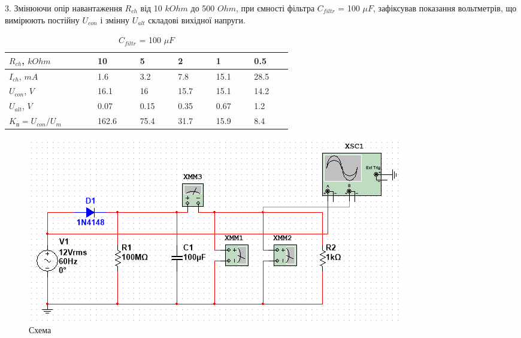 \documentclass{article}
\begin{document}
\begin{normalsize}
	3. Змінюючи опір навантаження $R_{ch}$ від 10 $kOhm$ до 500 $Ohm$, при ємності фільтра $C_{filtr}$ = 100 $\mu F$, зафіксував показання вольтметрів, що вимірюють постійну $U_{con}$ і змінну $U_{alt}$ складові вихідної напруги.
	
	\begin{table}[H]
		\centering
		\renewcommand*\arraystretch{1.3}
		\begin{tabular}{|p{0.15\linewidth}|p{0.08\linewidth}|p{0.08\linewidth}|p{0.08\linewidth}|p{0.08\linewidth}|p{0.08\linewidth}|}
			\hline
			$R_{ch}$, $kOhm$& 10 & 5 & 2 & 1 & 0.5\\
			\hline
			$I_{ch}$, $mA$& 1.6 & 3.2 & 7.8 & 15.1 & 28.5\\
			\hline
			$U_{con}$, $V$& 16.1 & 16 & 15.7 & 15.1 & 14.2\\
			\hline
			$U_{alt}$, $V$& 0.07 & 0.15 & 0.35 & 0.67 &1.2\\
			\hline
			$K_\text{п}=U_{con}/U_{m}$& 162.6 & 75.4 & 31.7 & 15.9 & 8.4\\
			\hline
		\end{tabular}
		\caption{$C_{filtr}$ = 100 $\mu F$}
	\end{table}
	
		\begin{figure}[H]
			\centering
			\includegraphics[width=\textwidth]{2}
			\caption{Схема}
	\end{figure}


\end{normalsize}
\end{document}
